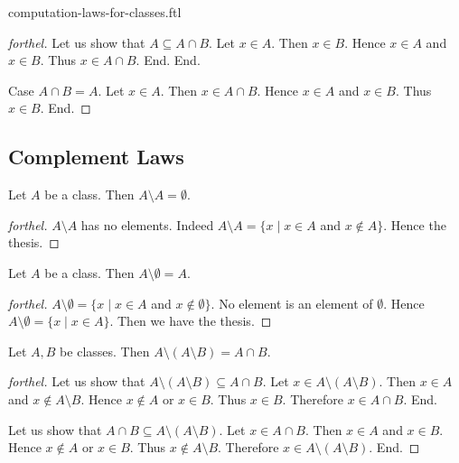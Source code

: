 \documentclass{naproche-library}
\begin{document}
\begin{smodule}{computation-laws-for-classes.ftl}
\begin{proof}[forthel]
      Let us show that $A \subseteq A \cap B$.
        Let $x \in A$.
        Then $x \in B$.
        Hence $x \in A$ and $x \in B$.
        Thus $x \in A \cap B$.
      End.
    End.

    Case $A \cap B = A$.
      Let $x \in A$.
      Then $x \in A \cap B$.
      Hence $x \in A$ and $x \in B$.
      Thus $x \in B$.
    End.
  \end{proof}


  \subsection*{Complement Laws}

  \begin{proposition}[forthel,id=FOUNDATIONS_02_7433299337150464,printid]
    Let $A$ be a class.
    Then $A \setminus A = \emptyset$.
  \end{proposition}
  \begin{proof}[forthel]
    $A \setminus A$ has no elements.
    Indeed $A \setminus A = \{ x \mid x \in A$ and $x \notin A \}$.
    Hence the thesis.
  \end{proof}

  \begin{proposition}[forthel,id=FOUNDATIONS_02_3783696985358336,printid]
    Let $A$ be a class.
    Then $A \setminus \emptyset = A$.
  \end{proposition}
  \begin{proof}[forthel]
    $A \setminus \emptyset = \{ x \mid x \in A$ and $x \notin \emptyset \}$.
    No element is an element of $\emptyset$.
    Hence $A \setminus \emptyset = \{ x \mid x \in A \}$.
    Then we have the thesis.
  \end{proof}

  \begin{proposition}[forthel,id=FOUNDATIONS_02_7083929257377792,printid]
    Let $A, B$ be classes.
    Then $A \setminus (A \setminus B) = A \cap B$.
  \end{proposition}
  \begin{proof}[forthel]
    Let us show that $A \setminus (A \setminus B) \subseteq A \cap B$.
      Let $x \in A \setminus (A \setminus B)$.
      Then $x \in A$ and $x \notin A \setminus B$.
      Hence $x \notin A$ or $x \in B$.
      Thus $x \in B$.
      Therefore $x \in A \cap B$.
    End.

    Let us show that $A \cap B \subseteq A \setminus (A \setminus B)$.
      Let $x \in A \cap B$.
      Then $x \in A$ and $x \in B$.
      Hence $x \notin A$ or $x \in B$.
      Thus $x \notin A \setminus B$.
      Therefore $x \in A \setminus (A \setminus B)$.
    End.
  \end{proof}


\end{smodule}
\end{document}
